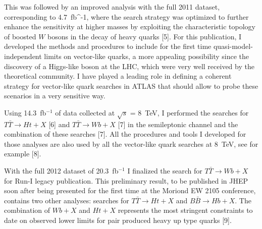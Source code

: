 \documentclass[12pt]{article}
\begin{document}
\begin{itemize}[leftmargin=1.3cm]
This was followed by an improved analysis with the full 
2011 dataset, corresponding to 4.7~fb^{-1}, where the search strategy was optimized to further enhance the sensitivity at higher masses by exploiting 
the characteristic topology of boosted $W$ bosons in the decay of heavy quarks [5]. 
For this publication, I developed the methods and procedures to include for the first time quasi-model-independent limits 
on vector-like quarks, a more appealing possibility since the discovery of a Higgs-like boson at the LHC, which were very well received by the theoretical community.
I have played a leading role in defining a coherent strategy for vector-like quark searches in ATLAS that should allow to probe these scenarios in a very sensitive way.
\vspace{2.5mm}

Using 14.3~fb$^{-1}$ of data collected at $\sqrt{s}$ = 8~TeV, I performed the searches for $T\bar{T} \rightarrow Ht+X$ [6] and $T\bar{T} \rightarrow Wb+X$ [7] in the 
semileptonic channel and the combination of these searches [7]. All the procedures and tools I developed 
for those analyses are also used by all the vector-like quark searches at 8~TeV, see for example [8].
\vspace{2.5mm}

With the full 2012 dataset of 20.3~fb$^{-1}$ I finalized the search for $T\bar{T} \rightarrow Wb+X$  for Run-I legacy publication.
This preliminary result, to be published in JHEP soon after being presented for the first time at the Moriond EW 2105 conference, contains two other analyses: searches for $T\bar{T} \rightarrow Ht+X$
and $B\bar{B} \rightarrow Hb+X$. The combination of $Wb+X$ and $Ht+X$ represents the most stringent constraints to date on observed lower limits for pair produced heavy up type quarks [9].  





\end{itemize}
\end{document}
